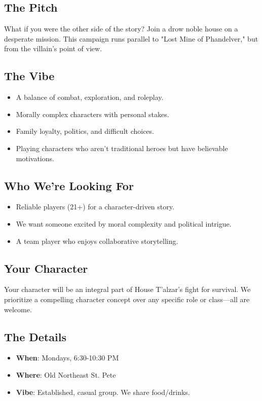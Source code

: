 \documentclass[a4paper, 8pt]{extarticle}
\begin{document}
\color{DrowPurple}


\vspace{2cm}

\subsection*{\textbf{The Pitch}}
What if you were the other side of the story? Join a drow noble house on a desperate mission. This campaign runs parallel to "Lost Mine of Phandelver," but from the villain's point of view.

\subsection*{\textbf{The Vibe}}
\begin{itemize}
    \item A balance of combat, exploration, and roleplay.
    \item Morally complex characters with personal stakes.
    \item Family loyalty, politics, and difficult choices.
    \item Playing characters who aren't traditional heroes but have believable motivations.
\end{itemize}

\subsection*{\textbf{Who We're Looking For}}
\begin{itemize}
    \item Reliable players (21+) for a character-driven story.
    \item We want someone excited by moral complexity and political intrigue.
    \item A team player who enjoys collaborative storytelling.
\end{itemize}

\subsection*{\textbf{Your Character}}
Your character will be an integral part of House T’alzar’s fight for survival. We prioritize a compelling character concept over any specific role or class—all are welcome.

\subsection*{\textbf{The Details}}
\begin{itemize}
    \item \textbf{When}: Mondays, 6:30-10:30 PM
    \item \textbf{Where}: Old Northeast St. Pete
    \item \textbf{Vibe}: Established, casual group. We share food/drinks.
\end{itemize}
\end{document}
